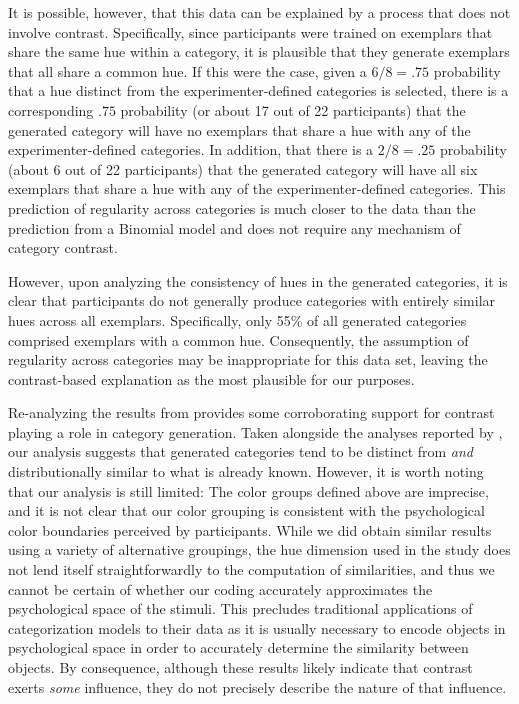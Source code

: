 \documentclass[12pt]{article}
\begin{document}
\begin{flushleft}
It is possible, however, that this data can be explained by a process that does
not involve contrast. Specifically, since participants were trained on exemplars
that share the same hue within a category, it is plausible that they generate
exemplars that all share a common hue. If this were the case, given a $6/8 = .75$
probability that a hue distinct from the experimenter-defined categories is
selected, there is a corresponding $.75$ probability (or about 17 out of 22
participants) that the generated category will have no exemplars that share a
hue with any  of the experimenter-defined categories. In addition, that there is
a $2/8 = .25$ probability (about 6 out of 22 participants) that the generated
category will have all six exemplars that share a hue with any of the
experimenter-defined categories. This prediction of regularity across categories
is much closer to the data than the prediction from a Binomial model and does
not require any mechanism of category contrast.

However, upon analyzing the consistency of hues in the generated categories, it
is clear that participants do not generally produce categories with entirely
similar hues across all exemplars. Specifically, only 55\%  of all generated
categories comprised exemplars with a common hue. Consequently, the assumption
of regularity across categories may be inappropriate for this data set, leaving
the contrast-based explanation as the most plausible for our purposes.

Re-analyzing the results from \cite{jern2013probabilistic} provides some
corroborating support for contrast playing a role in category generation. Taken
alongside the analyses reported by \cite{jern2013probabilistic}, our analysis
suggests that generated categories tend to be distinct from {\em and}
distributionally similar to what is already known. However, it is worth noting
that our analysis is still limited: The color groups defined above are
imprecise, and it is not clear that our color grouping is consistent with the
psychological color boundaries perceived by participants. While we did obtain
similar results using a variety of alternative groupings, the hue dimension used
in the \cite{jern2013probabilistic} study does not lend itself straightforwardly
to the computation of similarities, and thus we cannot be certain of whether our
coding accurately approximates the psychological space of the stimuli. This
precludes traditional applications of categorization models to their data as it
is usually necessary to encode objects in psychological space in order to
accurately determine the similarity between objects. By consequence, although
these results likely indicate that contrast exerts {\em some} influence, they do
not precisely describe the nature of that influence. 


\end{flushleft}
\end{document}
